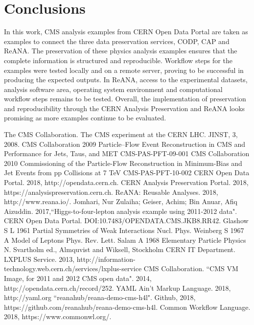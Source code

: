 \documentclass[letter]{article}
\newcommand\tab[1][1cm]{\hspace*{#1}}
\begin{document}
\section{Conclusions}
\tab In this work, CMS analysis examples from CERN Open Data Portal are taken as examples to connect the three data preservation services, CODP, CAP and ReANA.
The preservation of these physics analysis examples ensures that the complete information is structured and reproducible. Workflow steps for the examples were tested locally and on a remote server, proving to be successful in producing the expected outputs. In ReANA, access to the experimental datasets, analysis software area, operating system environment and computational workflow steps remains to be tested. Overall, the implementation of preservation and reproducibility through the CERN Analysis Preservation and ReANA looks promising as more examples continue to be evaluated. 


\begin{thebibliography}{9}
\begin{small}
The CMS Collaboration. The CMS experiment at the CERN LHC. JINST, 3, 2008.
CMS Collaboration 2009 Particle–Flow Event Reconstruction in CMS and Performance for Jets, Taus, and
MET CMS-PAS-PFT-09-001
CMS Collaboration 2010 Commissioning of the Particle-Flow Reconstruction in Minimum-Bias and Jet
Events from pp Collisions at 7 TeV CMS-PAS-PFT-10-002
CERN Open Data Portal. 2018, http://opendata.cern.ch. 
CERN Analysis Preservation Portal. 2018, https://analysispreservation.cern.ch. 
ReANA: Reusable Analyses. 2018, http://www.reana.io/.
Jomhari, Nur Zulaiha; Geiser, Achim; Bin Anuar, Afiq Aizuddin. 2017,``Higgs-to-four-lepton analysis example using 2011-2012 data". CERN Open Data Portal. DOI:10.7483/OPENDATA.CMS.JKB8.RR42.
Glashow S L 1961 Partial Symmetries of Weak Interactions Nucl. Phys.
Weinberg S 1967 A Model of Leptons Phys. Rev. Lett.
Salam A 1968 Elementary Particle Physics N. Svartholm ed., Almquvist and Wiksell, Stockholm
CERN IT Department. LXPLUS Service. 2013, http://information-technology.web.cern.ch/services/lxplus-service
CMS Collaboration. ``CMS VM Image, for 2011 and 2012 CMS open data". 2014, http://opendata.cern.ch/record/252. 
YAML Ain't Markup Language. 2018, http://yaml.org
``reanahub/reana-demo-cms-h4l". Github, 2018, https://github.com/reanahub/reana-demo-cms-h4l. 
Common Workflow Language. 2018, https://www.commonwl.org/. 
\end{small}
\end{thebibliography}
\end{document}
